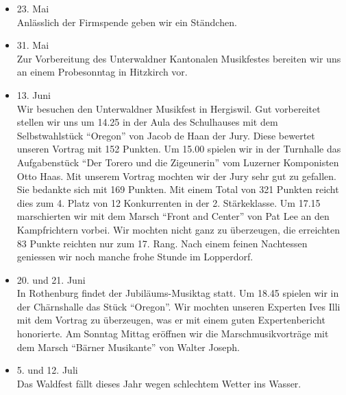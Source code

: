 \begin{history}
\begin{itemize}
        \item[]23. Mai\\
        Anlässlich der Firmspende geben wir ein Ständchen.

        \item[]31. Mai\\
        Zur Vorbereitung des Unterwaldner Kantonalen Musikfestes bereiten wir
        uns an einem Probesonntag in Hitzkirch vor.

        \item[]13. Juni\\
        Wir besuchen den Unterwaldner Musikfest in Hergiswil. Gut vorbereitet
        stellen wir uns um 14.25 in der Aula des Schulhauses mit dem
        Selbstwahlstück \enquote{Oregon} von Jacob de Haan der Jury. Diese
        bewertet unseren Vortrag mit 152 Punkten. Um 15.00 spielen wir in der
        Turnhalle das Aufgabenstück \enquote{Der Torero und die Zigeunerin} vom
        Luzerner Komponisten Otto Haas. Mit unserem Vortrag mochten wir der Jury
        sehr gut zu gefallen. Sie bedankte sich mit 169 Punkten. Mit einem Total
        von 321 Punkten reicht dies zum 4. Platz von 12 Konkurrenten in der 2.
        Stärkeklasse. Um 17.15 marschierten wir mit dem Marsch \enquote{Front
            and Center} von Pat Lee an den Kampfrichtern vorbei. Wir mochten nicht
        ganz zu überzeugen, die erreichten 83 Punkte reichten nur zum 17. Rang.
        Nach einem feinen Nachtessen geniessen wir  noch manche frohe Stunde im
        Lopperdorf.

        \item[]20. und 21. Juni\\
        In Rothenburg findet der Jubiläums-Musiktag statt. Um 18.45 spielen wir
        in der Chärnshalle das Stück \enquote{Oregon}. Wir mochten unseren
        Experten Ives Illi mit dem Vortrag zu überzeugen, was er mit einem guten
        Expertenbericht honorierte. Am Sonntag Mittag eröffnen wir die
        Marschmusikvorträge mit dem Marsch \enquote{Bärner Musikante} von Walter
        Joseph.

        \item[]5. und 12. Juli\\
        Das Waldfest fällt dieses Jahr wegen schlechtem Wetter ins Wasser.


\end{itemize}
\end{history}
